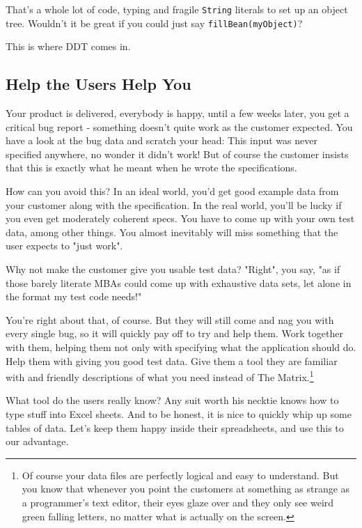 That's a whole lot of code, typing and fragile \texttt{String} literals to set up an object tree. Wouldn't it be great if you could just say \texttt{fillBean(myObject)}?

This is where \textsf{DDT} comes in.



\subsection{Help the Users Help You} %
\label{sub:help_the_users_help_you}

Your product is delivered, everybody is happy, until a few weeks later, you get a critical bug report - something doesn't quite work as the customer expected. You have a look at the bug data and scratch your head: This input was never specified anywhere, no wonder it didn't work! But of course the customer insists that this is exactly what he meant when he wrote the specifications.

How can you avoid this? In an ideal world, you'd get good example data from your customer along with the specification. In the real world, you'll be lucky if you even get moderately coherent specs. You have to come up with your own test data, among other things. You almost inevitably will miss something that the user expects to "just work".

Why not make the customer give you usable test data? "Right", you say, "as if those barely literate MBAs could come up with exhaustive data sets, let alone in the format my test code needs!"

You're right about that, of course. But they will still come and nag you with every single bug, so it will quickly pay off to try and help them. Work together with them, helping them not only with specifying what the application should do. Help them with giving you good test data. Give them a tool they are familiar with and friendly descriptions of what you need instead of The Matrix.\footnote{Of course your data files are perfectly logical and easy to understand. But you know that whenever you point the customers at something as strange as a programmer's text editor, their eyes glaze over and they only see weird green falling letters, no matter what is actually on the screen.}

What tool do the users really know? Any suit worth his necktie knows how to type stuff into \textsf{Excel} sheets. And to be honest, it is nice to quickly whip up some tables of data. Let's keep them happy inside their spreadsheets, and use this to our advantage.

